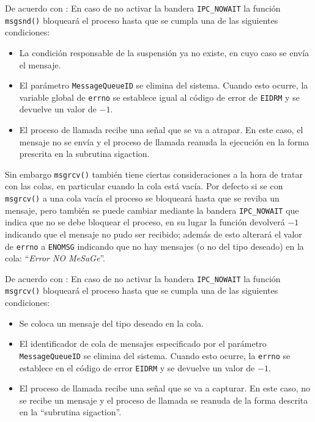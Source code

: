 De acuerdo con \textcite{msgsndYErno}: En caso de no activar la bandera \texttt{IPC\_NOWAIT} la función \texttt{msgsnd()} bloqueará el proceso hasta que se cumpla una de las siguientes condiciones:
\begin{itemize}
    \item La condición responsable de la suspensión ya no existe, en cuyo caso se envía el mensaje.
    \item El parámetro \texttt{MessageQueueID} se elimina del sistema. Cuando esto ocurre, la variable global de \texttt{errno} se establece igual al código de error de \texttt{EIDRM} y se devuelve un valor de $-1$.
    \item El proceso de llamada recibe una señal que se va a atrapar. En este caso, el mensaje no se envía y el proceso de llamada reanuda la ejecución en la forma prescrita en la subrutina sigaction.
\end{itemize}

Sin embargo \texttt{msgrcv()} también tiene ciertas consideraciones a la hora de tratar con las colas, en particular cuando la cola está vacía. Por defecto si se con \texttt{msgrcv()} a una cola vacía el proceso se bloqueará hasta que se reviba un mensaje, pero también se puede cambiar mediante la bandera \texttt{IPC\_NOWAIT} que indica que no se debe bloquear el proceso, en su lugar la función devolverá $-1$ indicando que el mensaje no pudo ser recibido; además de esto alterará el valor de \texttt{errno} a \texttt{ENOMSG} indicando que no hay mensajes (o no del tipo deseado) en la cola: ``\textit{Error NO MeSaGe}''.

De acuerdo con \textcite{msgrcvYErno}: En caso de no activar la bandera \texttt{IPC\_NOWAIT} la función \texttt{msgrcv()} bloqueará el proceso hasta que se cumpla una de las siguientes condiciones:
\begin{itemize}
    \item Se coloca un mensaje del tipo deseado en la cola.
    \item El identificador de cola de mensajes especificado por el parámetro \texttt{MessageQueueID} se elimina del sistema. Cuando esto ocurre, la \texttt{errno} se establece en el código de error \texttt{EIDRM} y se devuelve un valor de $-1$.
    \item El proceso de llamada recibe una señal que se va a capturar. En este caso, no se recibe un mensaje y el proceso de llamada se reanuda de la forma descrita en la ``subrutina sigaction''.
\end{itemize}



